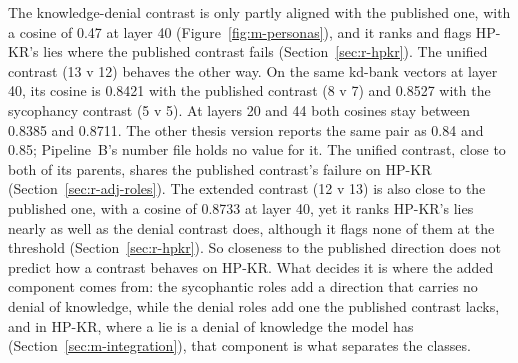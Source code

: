 The knowledge-denial contrast is only partly aligned with the published one, with a cosine of 0.47 at layer 40 (Figure~\ref{fig:m-personas}), and it ranks and flags HP-KR's lies where the published contrast fails (Section~\ref{sec:r-hpkr}). %
The unified contrast (13 v 12) behaves the other way. %
On the same kd-bank vectors at layer 40, its cosine is 0.8421 with the published contrast (8 v 7) and 0.8527 with the sycophancy contrast (5 v 5). %
At layers 20 and 44 both cosines stay between 0.8385 and 0.8711. %
The other thesis version reports the same pair as 0.84 and 0.85; Pipeline~B's number file holds no value for it. %
The unified contrast, close to both of its parents, shares the published contrast's failure on HP-KR (Section~\ref{sec:r-adj-roles}).
The extended contrast (12 v 13) is also close to the published one, with a cosine of 0.8733 at layer 40, yet it ranks HP-KR's lies nearly as well as the denial contrast does, although it flags none of them at the threshold (Section~\ref{sec:r-hpkr}). %
So closeness to the published direction does not predict how a contrast behaves on HP-KR. %
What decides it is where the added component comes from: the sycophantic roles add a direction that carries no denial of knowledge, while the denial roles add one the published contrast lacks, and in HP-KR, where a lie is a denial of knowledge the model has (Section~\ref{sec:m-integration}), that component is what separates the classes. %

